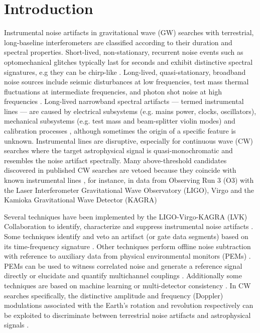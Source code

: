 \documentclass[pra,superscriptaddress,reprint,amsmath,amssymb,nofootinbib]{revtex4-2}
\begin{document}
\section{Introduction} \label{sec:intro}
Instrumental noise artifacts in gravitational wave (GW) searches with terrestrial, long-baseline interferometers are classified according to their duration and spectral properties.  Short-lived, non-stationary, recurrent noise events such as optomechanical glitches typically last for seconds and exhibit distinctive spectral signatures, e.g they can be chirp-like \cite{Blackburn2008,Aasi2012,Aasi2015,DetCharGW150914:2016,Glanzer2023}. Long-lived, quasi-stationary, broadband noise sources include seismic disturbances at low frequencies, test mass thermal fluctuations at intermediate frequencies, and photon shot noise at high frequencies \cite{AasiEtAlAdLIGO:2015,LIGOnoiseguide,2020Galax...8...82F,Akutsu2021PTEP,Davis2021,Nguyen2021}. Long-lived narrowband spectral artifacts --- termed instrumental lines --- are caused by electrical subsystems (e.g. mains power, clocks, oscillators), mechanical subsystems (e.g. test mass and beam-splitter violin modes) and calibration processes \cite{CovasEtAl:2018}, although sometimes the origin of a specific feature is unknown. Instrumental lines are disruptive, especially for continuous wave (CW) searches where the target astrophysical signal is quasi-monochromatic and resembles the noise artifact spectrally. Many above-threshold candidates discovered in published CW searches are vetoed because they coincide with known instrumental lines \cite{Piccinni2022,Riles2023,Wette2023}, for instance, in data from Observing Run 3 (O3) with the Laser Interferometer Gravitational Wave Observatory (LIGO), Virgo and the Kamioka Gravitational Wave Detector (KAGRA)  \cite[e.g.][]{Ligo_lineveto1,ligo_lineveto2,ligo_lineveto3,2015CQGra..32b4001A} \newline 


Several techniques have been implemented by the LIGO-Virgo-KAGRA (LVK) Collaboration to identify, characterize and suppress instrumental noise artifacts \cite{Davis2021,Davisgalaxies10010012}. Some techniques identify and veto an artifact (or gate data segments) based on its time-frequency signature \cite{Abbott2018CQVeto,Steltner2022Ph}. Other techniques perform offline noise subtraction with reference to auxiliary data from physical environmental monitors (PEMs) \cite{Driggers2012RScI,Tiwari2015,Davis2019,Driggers2019}. PEMs can be used to witness correlated noise and generate a reference signal directly or elucidate and quantify multichannel couplings \cite{Jung2022PRD,marin1997}. Additionally some techniques are based on machine learning \cite{Cuoco2020,Vajente2020PhR,OrmistonEtAl:2020,Yamamoto2023} or multi-detector consistency \cite{KeitelEtAl:2014, 2015PhyS...90l5001L}. In CW searches specifically, the distinctive amplitude and frequency (Doppler) modulations associated with the Earth's rotation and revolution respectively can be exploited to discriminate between terrestrial noise artifacts and astrophysical signals \cite{Zhu2017PhRvD,JonesPhysRevD.106.123011}.  \newline 
\end{document}
